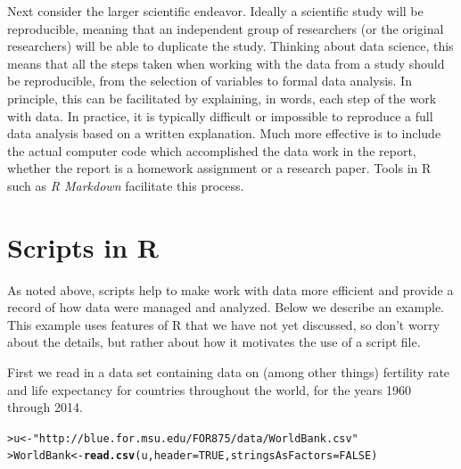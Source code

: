 \documentclass[12pt,oneside]{book}\usepackage[]{graphicx}\usepackage[]{color}
\makeatletter
\newcommand{\hlnum}[1]{\textcolor[rgb]{0.686,0.059,0.569}{#1}}%
\newcommand{\hlstr}[1]{\textcolor[rgb]{0.192,0.494,0.8}{#1}}%
\newcommand{\hlstd}[1]{\textcolor[rgb]{0.345,0.345,0.345}{#1}}%
\newcommand{\hlkwb}[1]{\textcolor[rgb]{0.69,0.353,0.396}{#1}}%
\newcommand{\hlkwc}[1]{\textcolor[rgb]{0.333,0.667,0.333}{#1}}%
\newcommand{\hlkwd}[1]{\textcolor[rgb]{0.737,0.353,0.396}{\textbf{#1}}}%
\newenvironment{kframe}{%
 \def\at@end@of@kframe{}%
 \ifinner\ifhmode%
  \def\at@end@of@kframe{\end{minipage}}%
  \begin{minipage}{\columnwidth}%
 \fi\fi%
 \def\FrameCommand##1{\hskip\@totalleftmargin \hskip-\fboxsep
 \colorbox{shadecolor}{##1}\hskip-\fboxsep
     \hskip-\linewidth \hskip-\@totalleftmargin \hskip\columnwidth}%
 \MakeFramed {\advance\hsize-\width
   \@totalleftmargin\z@ \linewidth\hsize
   \@setminipage}}%
 {\par\unskip\endMakeFramed%
 \at@end@of@kframe}
\newenvironment{knitrout}{}{} %
\makeatother
\begin{document}
Next consider the larger scientific endeavor. Ideally a scientific study will be reproducible, meaning that an independent group of researchers (or the original researchers) will be able to duplicate the study. Thinking about data science, this means that all the steps taken when working with the data from a study should be reproducible, from the selection of variables to formal data analysis. In principle, this can be facilitated by explaining, in words, each step of the work with data. In practice, it is typically difficult or impossible to reproduce a full data analysis based on a written explanation. Much more effective is to include the actual computer code which accomplished the data work in the report, whether the report is a homework assignment or a research paper. Tools in R such as \emph{R Markdown} facilitate this process. 

\section{Scripts in R}
As noted above, scripts help to make work with data more efficient and provide a record of how data were managed and analyzed. Below we describe an example. This example uses features of R that we have not yet discussed, so don't worry about the details, but rather about how it motivates the use of a script file. 

First we read in a data set containing data on (among other things) fertility rate and life expectancy for countries throughout the world, for the years 1960 through 2014. 
\begin{knitrout}
\color{fgcolor}\begin{kframe}
\begin{alltt}
\hlstd{> }\hlstd{u} \hlkwb{<-} \hlstr{"http://blue.for.msu.edu/FOR875/data/WorldBank.csv"}
\hlstd{> }\hlstd{WorldBank} \hlkwb{<-} \hlkwd{read.csv}\hlstd{(u,} \hlkwc{header} \hlstd{=} \hlnum{TRUE}\hlstd{,} \hlkwc{stringsAsFactors} \hlstd{=} \hlnum{FALSE}\hlstd{)}
\end{alltt}
\end{kframe}
\end{knitrout}
\end{document}
